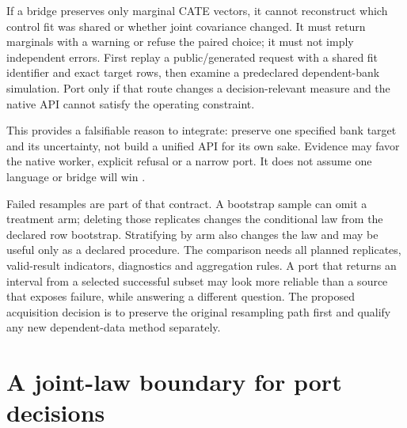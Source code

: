 If a bridge preserves only marginal CATE vectors, it cannot reconstruct which
control fit was shared or whether joint covariance changed. It must return
marginals with a warning or refuse the paired choice; it must not imply
independent errors. First replay a public/generated request with a shared fit
identifier and exact target rows, then examine a predeclared dependent-bank
simulation. Port only if that route changes a decision-relevant measure and the
native API cannot satisfy the operating constraint.

This provides a falsifiable reason to integrate: preserve one specified bank
target and its uncertainty, not build a unified API for its own sake. Evidence
may favor the native worker, explicit refusal or a narrow port. It does not
assume one language or bridge will win \citep{exec17_s9_admission}.

Failed resamples are part of that contract. A bootstrap sample can omit a
treatment arm; deleting those replicates changes the conditional law from
the declared row bootstrap. Stratifying by arm also changes the law and may
be useful only as a declared procedure. The comparison needs all planned
replicates, valid-result indicators, diagnostics and aggregation rules.
A port that returns an interval from a selected successful subset may look
more reliable than a source that exposes failure, while answering a different
question. The proposed acquisition decision is to preserve the original
resampling path first and qualify any new dependent-data method separately.

\section{A joint-law boundary for port decisions}
\label{exec17:s9-law-boundary}

